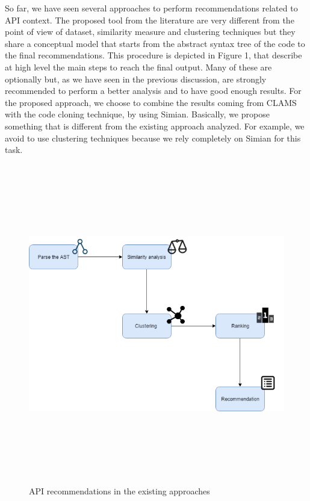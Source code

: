 So far, we have seen several approaches to perform recommendations related to API context. The proposed tool from the literature are very different from the point of view of dataset, similarity measure and clustering techniques but they share a conceptual model that starts from the abstract syntax tree of the code to the final recommendations. This procedure is depicted in Figure 1, that describe at high level the main steps to reach the final output. Many of these are optionally but, as we have seen in the previous discussion, are strongly recommended to perform a better analysis and to have good enough results.
For the proposed approach, we choose to combine the results coming from CLAMS with the code cloning technique, by using Simian. Basically, we propose something that is different from the existing approach analyzed. For example, we avoid to use clustering techniques because we rely completely on Simian for this task.  

\begin{figure}[!h]
\includegraphics[width=12cm,height=14cm,keepaspectratio]{images/approach.png}
\centering
\caption{API recommendations in the existing approaches}
\label{fig:cmd}
\end{figure}


